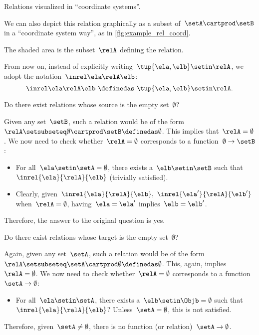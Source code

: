 \begin{marginfigure}
    \centering
    \caption{Relations visualized in ``coordinate systems''.}
    \label{fig:example_rel_coord}
\end{marginfigure}

We can also depict this relation graphically as a subset of~$\setA \cartprod \setB$ in a ``coordinate system way'', as in \cref{fig:example_rel_coord}.

The shaded area is the subset~$\relA$ defining the relation.

\begin{remark}
    From now on, instead of explicitly writing~$\tup{\ela,\elb}\setin \relA$, we adopt the notation~$\inrel \ela \relA \elb$:
    \begin{equation*}
        \inrel \ela \relA \elb \ \definedas\  \tup{\ela,\elb}\setin \relA.
    \end{equation*}
\end{remark}

\begin{exercise}
    Do there exist relations whose source is the empty set~$\emptyset$?
\end{exercise}
\begin{solution}
    Given any set~$\setB$, such a relation would be of the form~$\relA \setsubseteq \emptyset \cartprod \setB \definedas \emptyset$.
    This implies that~$\relA=\emptyset$.
    We now need to check whether~$\relA=\emptyset$ corresponds to a function~$\emptyset\to \setB$:
    \begin{itemize}
        \item For all~$\ela\setin \setA=\emptyset$, there exists a~$\elb \setin \setB$ such that $\inrel{\ela}{\relA}{\elb}$ (trivially satisfied).
        \item Clearly, given~$\inrel{\ela}{\relA}{\elb},~\inrel{\ela'}{\relA}{\elb'}$ when~$\relA=\emptyset$, having~$\ela=\ela'$ implies~$\elb=\elb'$.
    \end{itemize}
    Therefore, the answer to the original question is yes.
\end{solution}

\begin{exercise}
    Do there exist relations whose target is the empty set~$\emptyset$?
\end{exercise}
\begin{solution}
    Again, given any set~$\setA$, such a relation would be of the form~$\relA \setsubseteq \setA \cartprod \emptyset\definedas \emptyset$.
    This, again, implies~$\relA=\emptyset$.
    We now need to check whether~$\relA=\emptyset$ corresponds to a function~$\setA \to \emptyset$:
    \begin{itemize}
        \item For all~$\ela\setin \setA$, there exists a~$\elb\setin \Objb=\emptyset$ such that~$\inrel{\ela}{\relA}{\elb}$?
              Unless~$\setA=\emptyset$, this is not satisfied.
    \end{itemize}
    Therefore, given~$\setA \neq \emptyset$, there is no function (or relation)~$\setA \to \emptyset$.
\end{solution}

